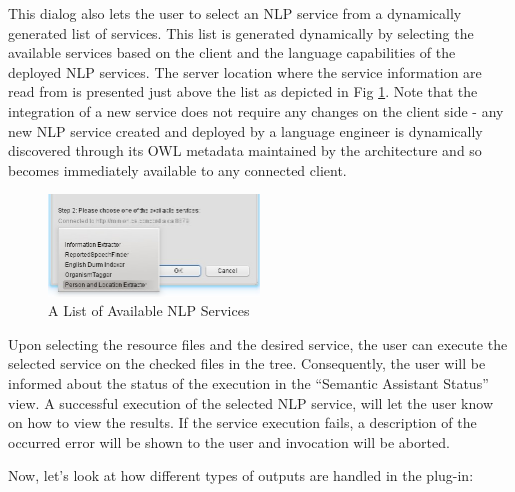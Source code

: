 This dialog also lets the user to select an NLP service from a dynamically
generated list of services. This list is generated dynamically by selecting the
available services based on the client and the language capabilities of the
deployed NLP services. The server location where the service information are read from is presented just above the list as depicted in Fig \ref{fig:eclipse_services}. Note that the integration of a new service does not
require any changes on the client side - any new NLP service created and
deployed by a language engineer is dynamically discovered through its OWL
metadata maintained by the architecture and so becomes immediately available to
any connected client.

\begin{figure}[htb]
\label{fig:eclipse_services}
\begin{center}
  \includegraphics[width=0.5\textwidth]{pictures/eclipse_services.jpg}
  \caption{A List of Available NLP Services}
  \label{fig:eclipse_services}
\end{center}
\end{figure}

Upon selecting the resource files and the desired service, the user can execute
the selected service on the checked files in the tree. Consequently, the user will be informed about the status of the execution in the ``Semantic Assistant Status'' view. A successful execution of the selected NLP service, will let the user know on how to view the results. If the service execution fails, a description of the occurred error will be shown to the user and invocation will be aborted.

Now, let's look at how different types of outputs are handled in the plug-in:

